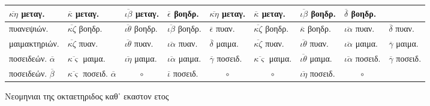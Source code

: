 \begin{tabular}{@{}l llllllll@{}}
$\overline{\kappa\eta}$      \textgreek{μεταγ.} &
$\overline{\kappa}$          \textgreek{μεταγ.} &
$\overline{\iota\beta}$      \textgreek{μεταγ.} &
$\overline{\epsilon}$        \textgreek{βοηδρ.} &
$\overline{\kappa\eta}$      \textgreek{μεταγ.} &
$\overline{\kappa}$          \textgreek{μεταγ.} &
$\overline{\iota\beta}$      \textgreek{βοηδρ.} &
$\overline{\delta}$          \textgreek{βοηδρ.}
\\
\hline
\textgreek{πυανεψιών.} &
$\overline{\kappa\zeta}$     \textgreek{βοηδρ.} &
$\overline{\iota\theta}$     \textgreek{βοηδρ.} &
$\overline{\iota\beta}$      \textgreek{βοηδρ.} &
$\overline{\epsilon}$        \textgreek{πυαν.} &
$\overline{\kappa\zeta}$     \textgreek{βοηδρ.} &
$\overline{\kappa}$          \textgreek{βοηδρ.} &
$\overline{\iota\alpha}$     \textgreek{πυαν.} &
$\overline{\delta}$          \textgreek{πυαν.}
\\
\textgreek{μαιμακτηριών.} &
$\overline{\kappa\zeta}$     \textgreek{πυαν.} &
$\overline{\iota\theta}$     \textgreek{πυαν.} &
$\overline{\iota\alpha}$     \textgreek{πυαν.} &
$\overline{\delta}$          \textgreek{μαιμα.} &
$\overline{\kappa\zeta}$     \textgreek{πυαν.} &
$\overline{\iota\theta}$     \textgreek{πυαν.} &
$\overline{\iota\alpha}$     \textgreek{μαιμα.} &
$\overline{\gamma}$          \textgreek{μαιμα.}
\\
\textgreek{ποσειδεών.} $\overline{\alpha}$&
$\overline{\kappa\varsigma}$ \textgreek{μαιμα.} &
$\overline{\iota\eta}$       \textgreek{μαιμα.} &
$\overline{\iota\alpha}$     \textgreek{μαιμα.} &
$\overline{\gamma}$          \textgreek{ποσειδ.} &
$\overline{\kappa\varsigma}$ \textgreek{μαιμα.} &
$\overline{\iota\theta}$     \textgreek{μαιμα.} &
$\overline{\iota\alpha}$     \textgreek{ποσειδ.} &
$\overline{\gamma}$          \textgreek{ποσειδ.}
\\
\textgreek{ποσειδεών.} $\overline{\beta}$&
$\overline{\kappa\varsigma}$ \textgreek{ποσειδ.} $\overline{\alpha}$ &
    \multicolumn{1}{c}{$\circ$} &
$\overline{\iota}$           \textgreek{ποσειδ.} &
    \multicolumn{1}{c}{$\circ$} &
    \multicolumn{1}{c}{$\circ$} &
$\overline{\iota\eta}$       \textgreek{ποσειδ.} &
    \multicolumn{1}{c}{$\circ$} &
~
\\
\bottomrule
\end{tabular}
%
\caption{\textgreek{Νεομηνιαι της οκταετηριδος καθ᾽ εκαστον ετος}}
\label{tab:p067b}
